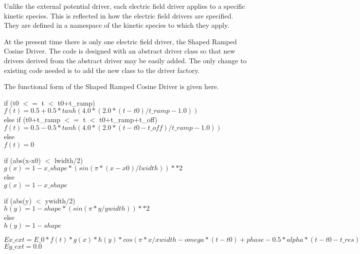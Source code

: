 \documentclass[11pt]{amsart}
\begin{document}
Unlike the external potential driver, each electric field driver applies to a
specific kinetic species.  This is reflected in how the electric field drivers
are specified.  They are defined in a namespace of the kinetic species to which
they apply.

At the present time there is only one electric field driver, the Shaped Ramped
Cosine Driver.  The code is designed with an abstract driver class so that
new drivers derived from the abstract driver may be easily added.  The only
change to existing code needed is to add the new class to the driver factory.

The functional form of the Shaped Ramped Cosine Driver is given here.

\noindent if (t0 $<=$ t $<$ t0+t\_ramp) \\
\indent \begin{math}f(t) = 0.5+0.5*tanh(4.0*(2.0*(t-t0)/t\_ramp-1.0)) \end{math} \\
else if (t0+t\_ramp $<=$ t $<$ t0+t\_ramp+t\_off) \\
\indent \begin{math}f(t) = 0.5-0.5*tanh(4.0*(2.0*(t-t0-t\_off)/t\_ramp-1.0)) \end{math} \\
else \\
\indent \begin{math}f(t) = 0\end{math}

\noindent if (abs(x-x0) $<$ lwidth/2) \\
\indent \begin{math}g(x) = 1-x\_shape*(sin(\pi*(x-x0)/lwidth))**2\end{math} \\
else \\
\indent \begin{math}g(x) = 1-x\_shape\end{math}

\noindent if (abs(y) $<$ ywidth/2) \\
\indent \begin{math}h(y) = 1-shape*(sin(\pi*y/ywidth))**2\end{math} \\
else \\
\indent \begin{math}h(y) = 1-shape\end{math}

\noindent \begin{math}Ex\_ext = E\_0*f(t)*g(x)*h(y)*
         cos(\pi*x/xwidth-omega*(t-t0)+phase-0.5*alpha*(t-t0-t\_res)**2)\end{math} \\
\begin{math}Ey\_ext = 0.0\end{math}
\end{document}
